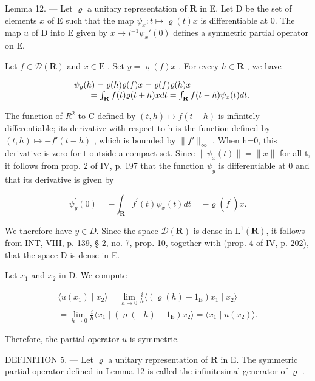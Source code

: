 Lemma 12. --- Let \(\varrho\) a unitary representation of \(\mathbf{R}\) in E. Let D be the set of elements \(x\) of E such that the map \(\psi_x: t \mapsto \varrho(t)x\) is differentiable at 0. The map \(u\) of D into E given by \(x \mapsto i^{-1} \psi_x'(0)\) defines a symmetric partial operator on E.

Let \(f \in \mathcal{D}(\mathbf{R})\) and \(x \in \mathrm{E}\) . Set \(y = \varrho(f)x\) . For every \(h \in \mathbf{R}\) , we have

\[
\begin{array}{r l} & {\psi_ {y} (h) = \varrho (h) \varrho (f) x = \varrho (f) \varrho (h) x} \\ & {\qquad = \int_ {\mathbf {R}} f (t) \varrho (t + h) x d t = \int_ {\mathbf {R}} f (t - h) \psi_ {x} (t) d t.} \end{array}
\]

The function of \(R^{2}\) to C defined by \((t,h)\mapsto f(t-h)\) is infinitely differentiable; its derivative with respect to h is the function defined by \((t,h)\mapsto -f'(t-h)\) , which is bounded by \(\|f'\|_{\infty}\) . When h=0, this derivative is zero for t outside a compact set. Since \(\|\psi_{x}(t)\|=\|x\|\) for all t, it follows from prop. 2 of IV, p. 197 that the function \(\psi_{y}\) is differentiable at 0 and that its derivative is given by

\[
\psi_ {y} ^ {\prime} (0) = - \int_ {\mathbf {R}} f ^ {\prime} (t) \psi_ {x} (t) d t = - \varrho (f ^ {\prime}) x.
\]

We therefore have \(y \in D\). Since the space \(\mathcal{D}(\mathbf{R})\) is dense in \(\mathrm{L}^{1}(\mathbf{R})\), it follows from INT, VIII, p. 139, § 2, no. 7, prop. 10, together with (prop. 4 of IV, p. 202), that the space D is dense in E.

Let \(x_{1}\) and \(x_{2}\) in D. We compute

\[
\begin{array}{c} \langle u (x _ {1}) \mid x _ {2} \rangle = \lim _ {h \to 0} \frac {i}{h} \langle (\varrho (h) - 1 _ {\mathrm{E}}) x _ {1} \mid x _ {2} \rangle \\ = \lim _ {h \to 0} \frac {i}{h} \langle x _ {1} \mid (\varrho (- h) - 1 _ {\mathrm{E}}) x _ {2} \rangle = \langle x _ {1} \mid u (x _ {2}) \rangle . \end{array}
\]

Therefore, the partial operator \(u\) is symmetric.

DEFINITION 5. --- Let \(\varrho\) a unitary representation of \(\mathbf{R}\) in E. The symmetric partial operator defined in Lemma 12 is called the infinitesimal generator of \(\varrho\) .

